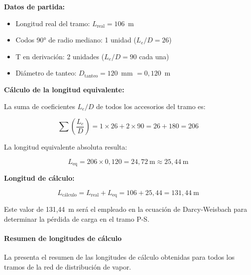 \textbf{Datos de partida:}
\begin{itemize}[leftmargin=2em]
	\item Longitud real del tramo: $L_{\text{real}} = 106$~m
	\item Codos 90° de radio mediano: 1 unidad ($L_e/D = 26$)
	\item T en derivación: 2 unidades ($L_e/D = 90$ cada una)
	\item Diámetro de tanteo: $D_{\text{tanteo}} = 120$~mm $= 0{,}120$~m
\end{itemize}

\textbf{Cálculo de la longitud equivalente:}

La suma de coeficientes $L_e/D$ de todos los accesorios del tramo es:

\begin{equation}
	\sum \left(\frac{L_e}{D}\right) = 1 \times 26 + 2 \times 90 = 26 + 180 = 206
	\label{eq:suma-LeD-PS}
\end{equation}

La longitud equivalente absoluta resulta:

\begin{equation}
	L_{\text{eq}} = 206 \times 0{,}120 = 24{,}72 \ \text{m} \approx 25{,}44 \ \text{m}
	\label{eq:Leq-PS}
\end{equation}

\textbf{Longitud de cálculo:}

\begin{equation}
	L_{\text{cálculo}} = L_{\text{real}} + L_{\text{eq}} = 106 + 25{,}44 = 131{,}44 \ \text{m}
	\label{eq:Lcalculo-PS}
\end{equation}

Este valor de 131,44~m será el empleado en la ecuación de Darcy-Weisbach para determinar la pérdida de carga en el tramo P-S.

\paragraph{Resumen de longitudes de cálculo}

La  presenta el resumen de las longitudes de cálculo obtenidas para todos los tramos de la red de distribución de vapor.

